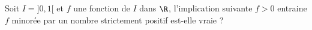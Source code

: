 Soit $I=]0,1[$ et $f$ une fonction de $I$ dans $\R$, l'implication suivante \newline
$f>0$ entraine $f$ minor\'ee par un nombre strictement positif est-elle vraie ?